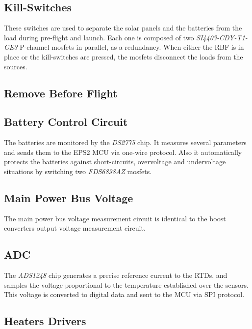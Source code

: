 \subsection{Kill-Switches}

These switches are used to separate the solar panels and the batteries from the load during pre-flight and launch. Each one is composed of two \textit{SI4403-CDY-T1-GE3} P-channel mosfets in parallel, as a redundancy. When either the RBF is in place or the kill-switches are pressed, the mosfets disconnect the loads from the sources.

\subsection{Remove Before Flight}

\subsection{Battery Control Circuit}

The batteries are monitored by the \textit{DS2775} chip. It measures several parameters and sends them to the EPS2 MCU via one-wire protocol. Also it automatically protects the batteries against short-circuits, overvoltage and undervoltage situations by switching two \textit{FDS6898AZ} mosfets.

\subsection{Main Power Bus Voltage}

The main power bus voltage measurement circuit is identical to the boost converters output voltage measurement circuit.

\subsection{ADC}

The \textit{ADS1248} chip generates a precise reference current to the RTDs, and samples the voltage proportional to the temperature established over the sensors. This voltage is converted to digital data and sent to the MCU via SPI protocol.

\subsection{Heaters Drivers}

